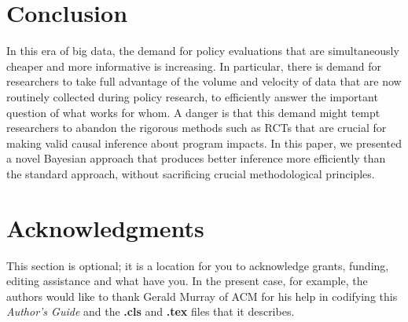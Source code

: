 \documentclass{acm_proc_article-sp}
\begin{document}
\section{Conclusion}
In this era of big data, the demand for policy evaluations that are simultaneously cheaper and more informative is increasing. In particular, there is demand for researchers to take full advantage of the volume and velocity of data that are now routinely collected during policy research, to efficiently answer the important question of what works for whom. A danger is that this demand might tempt researchers to abandon the rigorous methods such as RCTs that are crucial for making valid causal inference about program impacts. In this paper, we presented a novel Bayesian approach that produces better inference more efficiently than the standard approach, without sacrificing crucial methodological principles.

\section{Acknowledgments}
This section is optional; it is a location for you
to acknowledge grants, funding, editing assistance and
what have you.  In the present case, for example, the
authors would like to thank Gerald Murray of ACM for
his help in codifying this \textit{Author's Guide}
and the \textbf{.cls} and \textbf{.tex} files that it describes.

%

%
%
\end{document}
